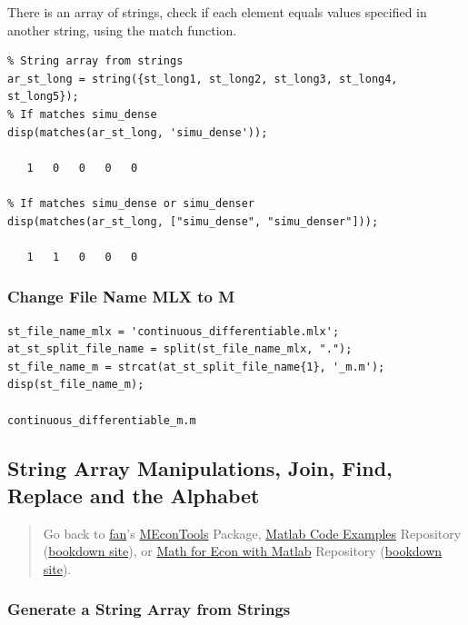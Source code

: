 \documentclass[
]{book}
\begin{document}
There is an array of strings, check if each element equals values
specified in another string, using the match function.

\begin{verbatim}
% String array from strings
ar_st_long = string({st_long1, st_long2, st_long3, st_long4, st_long5});
% If matches simu_dense
disp(matches(ar_st_long, 'simu_dense'));

   1   0   0   0   0

% If matches simu_dense or simu_denser
disp(matches(ar_st_long, ["simu_dense", "simu_denser"]));

   1   1   0   0   0
\end{verbatim}

\hypertarget{change-file-name-mlx-to-m}{%
\subsubsection{Change File Name MLX to M}\label{change-file-name-mlx-to-m}}

\begin{verbatim}
st_file_name_mlx = 'continuous_differentiable.mlx';
at_st_split_file_name = split(st_file_name_mlx, ".");
st_file_name_m = strcat(at_st_split_file_name{1}, '_m.m');
disp(st_file_name_m);

continuous_differentiable_m.m
\end{verbatim}

\hypertarget{string-array-manipulations-join-find-replace-and-the-alphabet}{%
\subsection{String Array Manipulations, Join, Find, Replace and the Alphabet}\label{string-array-manipulations-join-find-replace-and-the-alphabet}}

\begin{quote}
Go back to \href{http://fanwangecon.github.io/}{fan}'s \href{https://fanwangecon.github.io/MEconTools/}{MEconTools} Package, \href{https://fanwangecon.github.io/M4Econ/}{Matlab Code Examples} Repository (\href{https://fanwangecon.github.io/M4Econ/bookdown}{bookdown site}), or \href{https://fanwangecon.github.io/Math4Econ/}{Math for Econ with Matlab} Repository (\href{https://fanwangecon.github.io/Math4Econ/bookdown}{bookdown site}).
\end{quote}

\hypertarget{generate-a-string-array-from-strings}{%
\subsubsection{Generate a String Array from Strings}\label{generate-a-string-array-from-strings}}
\end{document}
